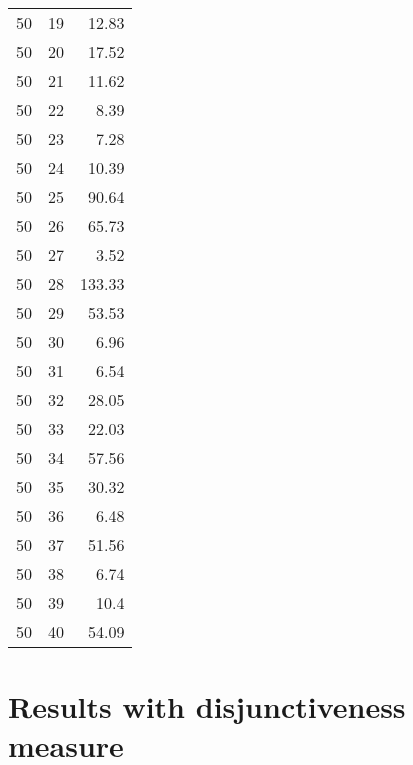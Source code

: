 \documentclass[13pt, letterpaper, oneside]{book}
\begin{document}
\begin{multicols}{5}
\begin{tabular}{c c r}
50 & 19 & 12.83 \\
50 & 20 & 17.52 \\
50 & 21 & 11.62 \\
50 & 22 & 8.39 \\
50 & 23 & 7.28 \\
50 & 24 & 10.39 \\
50 & 25 & 90.64 \\
50 & 26 & 65.73 \\
50 & 27 & 3.52 \\
50 & 28 & 133.33 \\
50 & 29 & 53.53 \\
50 & 30 & 6.96 \\
50 & 31 & 6.54 \\
50 & 32 & 28.05 \\
50 & 33 & 22.03 \\
50 & 34 & 57.56 \\
50 & 35 & 30.32 \\
50 & 36 & 6.48 \\
50 & 37 & 51.56 \\
50 & 38 & 6.74 \\
50 & 39 & 10.4 \\
50 & 40 & 54.09 \\
\bottomrule
\end{tabular}
\end{multicols}

\section{Results with disjunctiveness measure}
\end{document}

